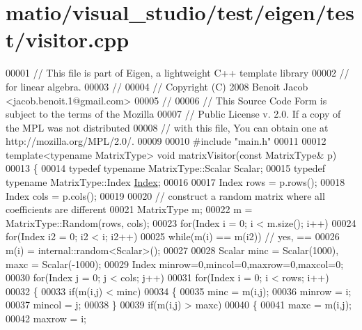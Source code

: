 \hypertarget{matio_2visual__studio_2test_2eigen_2test_2visitor_8cpp_source}{}\section{matio/visual\+\_\+studio/test/eigen/test/visitor.cpp}
\label{matio_2visual__studio_2test_2eigen_2test_2visitor_8cpp_source}

\begin{DoxyCode}
00001 \textcolor{comment}{// This file is part of Eigen, a lightweight C++ template library}
00002 \textcolor{comment}{// for linear algebra.}
00003 \textcolor{comment}{//}
00004 \textcolor{comment}{// Copyright (C) 2008 Benoit Jacob <jacob.benoit.1@gmail.com>}
00005 \textcolor{comment}{//}
00006 \textcolor{comment}{// This Source Code Form is subject to the terms of the Mozilla}
00007 \textcolor{comment}{// Public License v. 2.0. If a copy of the MPL was not distributed}
00008 \textcolor{comment}{// with this file, You can obtain one at http://mozilla.org/MPL/2.0/.}
00009 
00010 \textcolor{preprocessor}{#include "main.h"}
00011 
00012 \textcolor{keyword}{template}<\textcolor{keyword}{typename} MatrixType> \textcolor{keywordtype}{void} matrixVisitor(\textcolor{keyword}{const} MatrixType& p)
00013 \{
00014   \textcolor{keyword}{typedef} \textcolor{keyword}{typename} MatrixType::Scalar Scalar;
00015   \textcolor{keyword}{typedef} \textcolor{keyword}{typename} MatrixType::Index \hyperlink{namespace_eigen_a62e77e0933482dafde8fe197d9a2cfde}{Index};
00016 
00017   Index rows = p.rows();
00018   Index cols = p.cols();
00019 
00020   \textcolor{comment}{// construct a random matrix where all coefficients are different}
00021   MatrixType m;
00022   m = MatrixType::Random(rows, cols);
00023   \textcolor{keywordflow}{for}(Index i = 0; i < m.size(); i++)
00024     \textcolor{keywordflow}{for}(Index i2 = 0; i2 < i; i2++)
00025       \textcolor{keywordflow}{while}(m(i) == m(i2)) \textcolor{comment}{// yes, ==}
00026         m(i) = internal::random<Scalar>();
00027   
00028   Scalar minc = Scalar(1000), maxc = Scalar(-1000);
00029   Index minrow=0,mincol=0,maxrow=0,maxcol=0;
00030   \textcolor{keywordflow}{for}(Index j = 0; j < cols; j++)
00031   \textcolor{keywordflow}{for}(Index i = 0; i < rows; i++)
00032   \{
00033     \textcolor{keywordflow}{if}(m(i,j) < minc)
00034     \{
00035       minc = m(i,j);
00036       minrow = i;
00037       mincol = j;
00038     \}
00039     \textcolor{keywordflow}{if}(m(i,j) > maxc)
00040     \{
00041       maxc = m(i,j);
00042       maxrow = i;

\end{DoxyCode}
